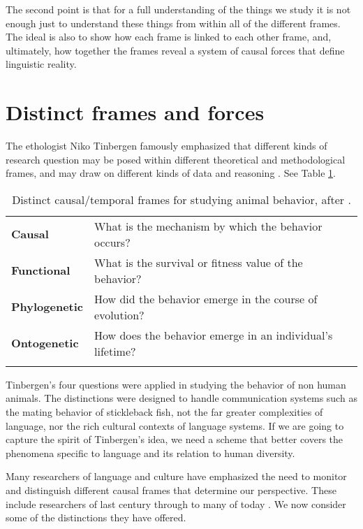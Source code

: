 The second point is that for a full understanding of the 
things we study it is not enough just to understand these 
things from within all of the different frames. The ideal is also to 
show how each frame is linked to each other frame, and, ultimately, how 
together the frames reveal a system of causal forces 
that define linguistic reality.



\section{Distinct frames and forces}
\label{Distinctframesandforces}

The ethologist Niko Tinbergen famously emphasized that different kinds of research question may be 
posed within different theoretical and methodological frames, and may 
draw on different kinds of data and reasoning \citep{tinbergen_aims_1963}. See Table \ref{tinbergenfour}.



\begin{table}[h]
\centering
\begin{tabular}{ll}
\lsptoprule
\textbf{Causal} & What is the mechanism by which the behavior occurs?
\\
\textbf{Functional} & What is the survival or fitness value of the 
behavior? \\
\textbf{Phylogenetic} & How did the behavior emerge in the course of 
evolution? \\
\textbf{Ontogenetic} & How does the behavior emerge in an individual's 
lifetime? \\
\lspbottomrule
\end{tabular}
\caption{Distinct causal/temporal frames for studying animal 
behavior, after \citet{tinbergen_aims_1963}.}
\label{tinbergenfour}
\end{table}



Tinbergen's four questions were applied in studying the behavior of 
non human animals. The distinctions were designed to handle 
communication systems such as the mating behavior of stickleback fish, 
not the far greater complexities of language, nor the rich cultural 
contexts of language systems. If we are going to capture the spirit of 
Tinbergen's idea, we need a scheme that better covers the phenomena 
specific to language and its relation to human diversity. 


Many researchers of language and culture have emphasized the need to monitor and distinguish different causal frames that determine our perspective. These include researchers of last century \citep{saussure_cours_1916,vygotsky_thought_1962} through 
to many of today \citep{tomasello_constructing_2003,macwhinney_emergence_2005,raczaszek-leonardi_multiple_2010,cole_phylogeny_2007,donald_slow_2007,larsen-freeman_complexity_2008,uryu_ecology_2014,lemke_across_2000,lemke_language_2002}. We now consider some of the distinctions they have offered.




